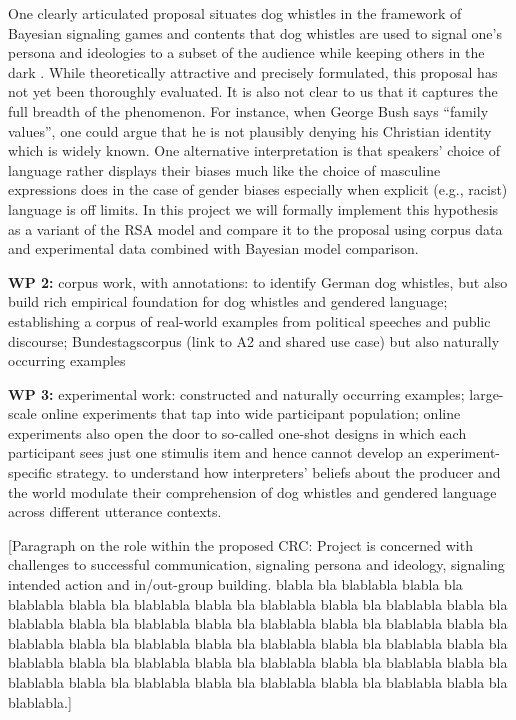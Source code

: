 \documentclass[11pt]{article}
\begin{document}
 One clearly articulated proposal situates dog whistles in the framework of Bayesian signaling games \parencite{Burnett2017} and contents that dog whistles are used to signal one’s persona and ideologies to a subset of the audience while keeping others in the dark \parencite{HendersonMcCready2018, HendersonMcCready2019}.  While theoretically attractive and precisely formulated, this proposal has not yet been thoroughly evaluated.  It is also not clear to us that it captures the full breadth of the phenomenon.  For instance, when George Bush says “family values”, one could argue that he is not plausibly denying his Christian identity which is widely known.  One alternative interpretation is that speakers’ choice of language rather displays their biases much like the choice of masculine expressions does in the case of gender biases especially when explicit (e.g., racist) language is off limits.  In this project we will formally implement this hypothesis as a variant of the RSA model and compare it to the \citeauthor{HendersonMcCready2019} proposal using corpus data and experimental data combined with Bayesian model comparison.

{\bf WP 2:} corpus work, with annotations: to identify German dog whistles, but also build rich empirical foundation for dog whistles and gendered language; establishing a corpus of real-world examples from political speeches and public discourse; Bundestagscorpus (link to A2 and shared use case) but also naturally occurring examples

{\bf WP 3:} experimental work: constructed and naturally occurring examples; large-scale online experiments that tap into wide participant population; online experiments also open the door to so-called one-shot designs in which each participant sees just one stimulis item and hence cannot develop an experiment-specific strategy.  to understand how interpreters' beliefs about the producer and the world modulate their comprehension of dog whistles and gendered language across different utterance contexts.

[Paragraph on the role within the proposed CRC: Project is concerned with challenges to successful communication, signaling persona and ideology, signaling intended action and in/out-group building. blabla bla blablabla blabla bla blablabla blabla bla blablabla blabla bla blablabla blabla bla blablabla blabla bla blablabla blabla bla blablabla blabla bla blablabla blabla bla blablabla blabla bla blablabla blabla bla blablabla blabla bla blablabla blabla bla blablabla blabla bla blablabla blabla bla blablabla blabla bla blablabla blabla bla blablabla blabla bla blablabla blabla bla blablabla blabla bla blablabla blabla bla blablabla blabla bla blablabla.] 
\end{document}
